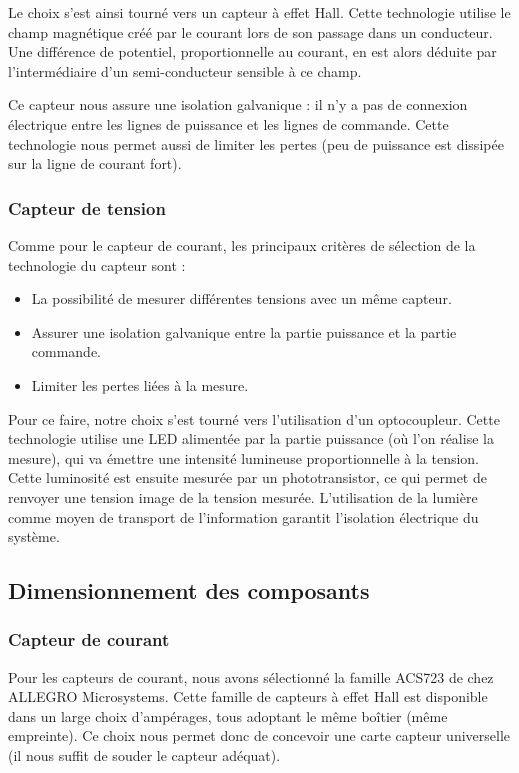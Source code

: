                 Le choix s'est ainsi tourné vers un capteur à effet Hall. Cette technologie utilise le champ magnétique créé par le courant lors de son passage dans un conducteur. Une différence de potentiel, proportionnelle au courant, en est alors déduite par l'intermédiaire d'un semi-conducteur sensible à ce champ.
                
                Ce capteur nous assure une isolation galvanique : il n'y a pas de connexion électrique entre les lignes de puissance et les lignes de commande. Cette technologie nous permet aussi de limiter les pertes (peu de puissance est dissipée sur la ligne de courant fort).

            \subsubsection{Capteur de tension}
                Comme pour le capteur de courant, les principaux critères de sélection de la technologie du capteur sont :
                \begin{itemize}
                    \item La possibilité de mesurer différentes tensions avec un même capteur.
                    \item Assurer une isolation galvanique entre la partie puissance et la partie commande.
                    \item Limiter les pertes liées à la mesure.
                \end{itemize}

                Pour ce faire, notre choix s'est tourné vers l'utilisation d'un optocoupleur. Cette technologie utilise une LED alimentée par la partie puissance (où l'on réalise la mesure), qui va émettre une intensité lumineuse proportionnelle à la tension. Cette luminosité est ensuite mesurée par un phototransistor, ce qui permet de renvoyer une tension image de la tension mesurée. L'utilisation de la lumière comme moyen de transport de l'information garantit l'isolation électrique du système.

        \subsection{Dimensionnement des composants}
            \subsubsection{Capteur de courant}
                Pour les capteurs de courant, nous avons sélectionné la famille ACS723 de chez ALLEGRO Microsystems. Cette famille de capteurs à effet Hall est disponible dans un large choix d'ampérages, tous adoptant le même boîtier (même empreinte). Ce choix nous permet donc de concevoir une carte capteur universelle (il nous suffit de souder le capteur adéquat).
                
